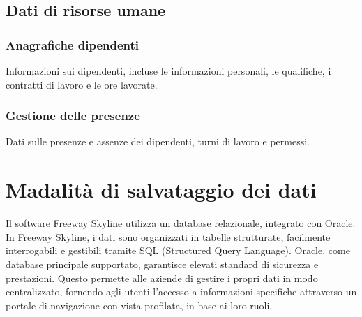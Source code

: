 \documentclass{article}
\begin{document}
\subsection{Dati di risorse umane}
\subsubsection{Anagrafiche dipendenti}
Informazioni sui dipendenti, incluse le informazioni personali, le qualifiche, i contratti di lavoro e le ore lavorate.
\subsubsection{Gestione delle presenze}
Dati sulle presenze e assenze dei dipendenti, turni di lavoro e permessi.

\section{Madalità di salvataggio dei dati}
Il software Freeway Skyline utilizza un database relazionale, integrato con Oracle.\\
In Freeway Skyline, i dati sono organizzati in tabelle strutturate, facilmente interrogabili e gestibili tramite SQL (Structured Query Language). Oracle, come database principale supportato, garantisce elevati standard di sicurezza e prestazioni. Questo permette alle aziende di gestire i propri dati in modo centralizzato, fornendo agli utenti l'accesso a informazioni specifiche attraverso un portale di navigazione con vista profilata, in base ai loro ruoli.\\
\end{document}
